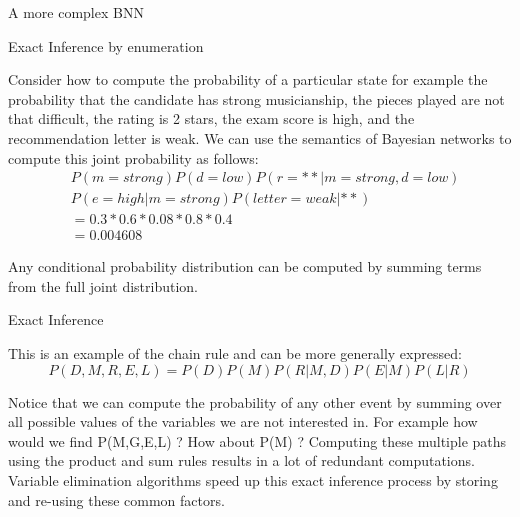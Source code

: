 \documentclass[12pt]{beamer}
\begin{document}
\begin{frame}{A more complex BNN}
\begin{center}
\end{center} 

\end{frame}






\begin{frame}{Exact Inference by enumeration}

  Consider how to compute the probability of a particular state for
  example the probability that the candidate has strong musicianship,
  the pieces played are not that difficult, the rating is 2 stars, the
  exam score is high, and the recommendation letter is weak. We can
  use the semantics of Bayesian networks to compute this joint
  probability as follows:
  \begin{eqnarray*}
    & P(m = strong) P(d = low) P(r=**| m = strong, d=low) \\
    & P(e=high | m=strong) P(letter=weak|**)    \\
    &= 0.3 * 0.6 * 0.08 * 0.8 * 0.4 \\
    &= 0.004608
  \end{eqnarray*}

  Any conditional probability distribution can be computed by summing
  terms from the full joint distribution.

\end{frame}

\begin{frame}{Exact Inference}

  This is an example of the chain rule and can be more generally expressed:
  \[
  P(D,M,R,E,L) = P(D)P(M)P(R|M,D)P(E|M)P(L|R)
  \]

  Notice that we can compute the probability of any other event by
  summing over all possible values of the variables we are not
  interested in. For example how would we find P(M,G,E,L) ? How about
  P(M) ? Computing these multiple paths using the product and sum
  rules results in a lot of redundant computations. Variable
  elimination algorithms speed up this exact inference process by
  storing and re-using these common factors.

  
\end{frame}
\end{document}

